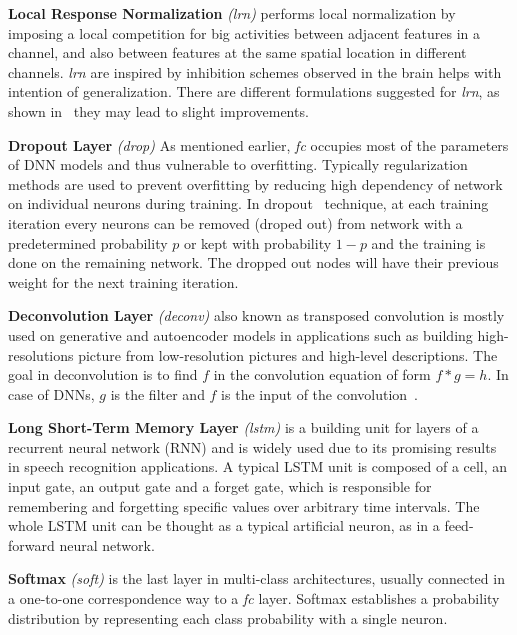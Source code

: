 \textbf{Local Response Normalization} \textit{(lrn)} performs local normalization by imposing a local competition for big activities between adjacent features in a channel, and also between features at the same spatial location in different channels. \textit{lrn} are inspired by inhibition schemes observed in the brain helps with intention of generalization. There are different formulations suggested for \textit{lrn}, as shown in~\cite{AlexNet, multiStageArc} they may lead to slight improvements. 

\textbf{Dropout Layer} \textit{(drop)} 
As mentioned earlier, \textit{fc} occupies most of the parameters of DNN models and thus vulnerable to overfitting. Typically regularization methods are used to prevent overfitting by reducing high dependency of network on individual neurons during training. In dropout~\cite{DropOut} technique, at each training iteration every neurons can be removed (droped out) from network with a predetermined probability $p$ or kept with probability $1-p$ and the training is done on the remaining network. The dropped out nodes will have their previous weight for the next training iteration. 

\textbf{Deconvolution Layer} \textit{(deconv)} also known as transposed convolution is mostly used on generative and autoencoder models in applications such as building high-resolutions picture from low-resolution pictures and high-level descriptions. The goal in deconvolution is to find $f$ in the convolution equation of form $f*g=h$. In case of DNNs, $g$ is the filter and $f$ is the input of the convolution~\cite{Deconv}.

\textbf{Long Short-Term Memory Layer} \textit{(lstm)} is a building unit for layers of a recurrent neural network (RNN) and is widely used due to its promising results in speech recognition applications. A typical LSTM unit is composed of a cell, an input gate, an output gate and a forget gate, which is responsible for remembering and forgetting specific values over arbitrary time intervals. The whole LSTM unit can be thought as a typical artificial neuron, as in a feed-forward neural network.

\textbf{Softmax} \textit{(soft)} is the last layer in multi-class architectures, usually connected in a one-to-one correspondence way to a \textit{fc} layer. Softmax establishes a probability distribution by representing each class probability with a single neuron. 

